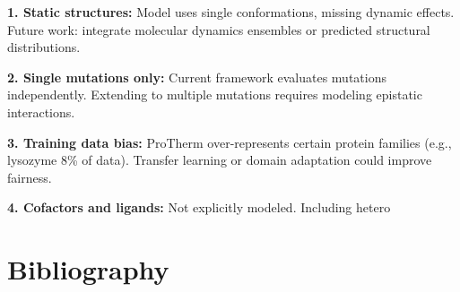 \documentclass[12pt,en]{elegantpaper}
\begin{document}
\textbf{1. Static structures:} Model uses single conformations, missing dynamic effects. Future work: integrate molecular dynamics ensembles or predicted structural distributions.

\textbf{2. Single mutations only:} Current framework evaluates mutations independently. Extending to multiple mutations requires modeling epistatic interactions.

\textbf{3. Training data bias:} ProTherm over-represents certain protein families (e.g., lysozyme 8\% of data). Transfer learning or domain adaptation could improve fairness.

\textbf{4. Cofactors and ligands:} Not explicitly modeled. Including hetero


\begin{acknowledgements}
\blindtext
\end{acknowledgements}

\section*{Bibliography}



\end{document}
